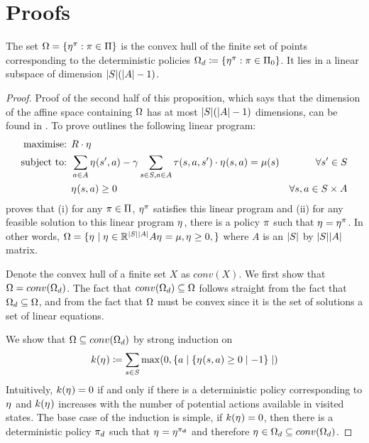 \section{Proofs}
\label{appendix:proofs}

\setcounter{proposition}{0}
\setcounter{theorem}{0}
\setcounter{corollary}{0}

\begin{proposition}
The set $\Polytope = \{\occmeas{\policy}: \policy \in \Policies\}$ is the convex hull of the finite set of points corresponding to the deterministic policies $\Polytope_d \coloneqq \{\occmeas{\policy}: \policy \in \DetPolicies\}$. It lies in a linear subspace of dimension $|\S|(|\A| - 1)$.
\end{proposition}

\begin{proof}

Proof of the second half of this proposition, which says that the dimension of the affine space containing $\Polytope$ has at most $|\S|(|\A|-1)$ dimensions, can be found in \cite[Lemma~A.2]{skalse2023misspecification}.
To prove
\citet[Equation~6.9.2]{puterman1994} outlines the following linear program:
\begin{align*}
    \text{maximise: } & \R \cdot \occmeas{} & \\
    \text{subject to: } &  
    \sum_{a \in \A} \occmeas{}(s',a) - \discount \sum_{s \in \S, a \in \A} \T(s, a, s')\cdot \occmeas{}(s,a) = \m(s)  &  \forall s' \in \S \\
    & \occmeas{}(s,a) \geq 0 & \forall s,a \in \S \times \A
\end{align*}
\citet[Theorem~6.9.1]{puterman1994} proves that (i) for any $\policy \in \Policies$, $\occmeas{\policy}$ satisfies this linear program and (ii) for any feasible solution to this linear program $\occmeas{}$, there is a policy $\policy$ such that $\occmeas{} = \occmeas{\policy}$. In other words, $\Omega = \{\occmeas{} \mid \occmeas{} \in \mathbb{R}^{|\S||\A|} A\occmeas{}=\mu, \occmeas{} \geq 0,\}$ where $A$ is an $|\S|$ by $|\S||\A|$ matrix.

Denote the convex hull of a finite set $X$ as $conv(X)$. We first show that $\Polytope = conv(\Polytope_d)$. The fact that $conv(\Polytope_d) \subseteq \Polytope$ follows straight from the fact that $\Polytope_d \subseteq \Polytope$, and from the fact that $\Polytope$ must be convex since it is the set of solutions a set of linear equations.

We show that $\Polytope \subseteq conv(\Polytope_d)$ by strong induction on 
$$k(\occmeas{}) \coloneqq \sum_{s \in \S} \max (0, \{ a \mid \{\occmeas{}(s,a)\geq 0 \mid - 1 \} \mid)$$
Intuitively, $k(\occmeas{}) = 0$ if and only if there is a deterministic policy corresponding to $\occmeas{}$ and $k(\occmeas{})$ increases with the number of potential actions available in visited states. The base case of the induction is simple, if $k(\occmeas{}) = 0$, then there is a deterministic policy $\policy_d$ such that $\occmeas{} = \occmeas{\policy_d}$ and therefore $\occmeas{} \in \Polytope_d \subseteq conv(\Polytope_d)$.


\end{proof}
